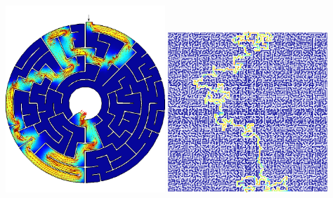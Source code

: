 \documentclass[
  ignorenonframetext,
  aspectratio=169,
]{beamer}
\begin{document}
\begin{frame}{}
\begin{columns}[T]
\begin{column}{0.5\textwidth}
\centering \includegraphics[width=0.45\textwidth,height=\textheight]{maze-theta.png}
\centering \includegraphics[width=0.45\textwidth,height=\textheight]{big-maze-solved.png}
\end{column}
\end{columns}
\end{frame}
\end{document}
